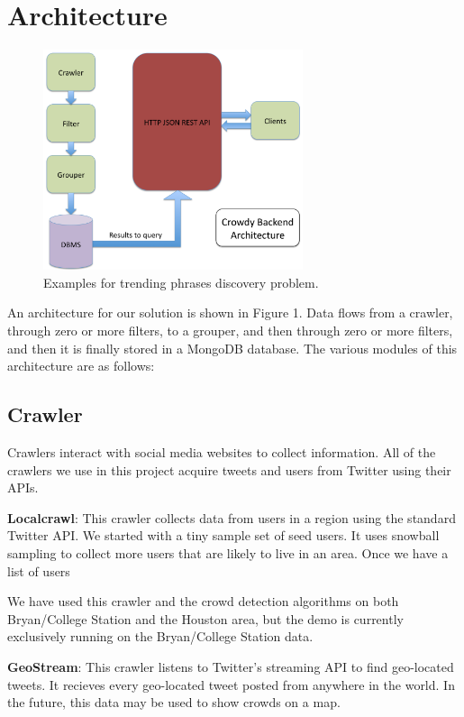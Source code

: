 \documentclass{sig-alternate}
\begin{document}
\section{Architecture}
\label{sec:architecture}
\begin{figure}[!t]
\begin{center}
\includegraphics[width=3.0in]{images/architecture}
\caption{Examples for trending phrases discovery problem.}
\label{fig:candidate_phrases}
\end{center}
\end{figure}

An architecture for our solution is shown in Figure 1.  Data flows from a
crawler, through zero or more filters, to a grouper, and then through zero or
more filters, and then it is finally stored in a MongoDB database.  The various
modules of this architecture are as follows:

\subsection{Crawler}
Crawlers interact with social media websites to collect information. All of the
crawlers we use in this project acquire tweets and users from Twitter using
their APIs.

\medskip \noindent \textbf{Localcrawl}: This crawler collects data from users
in a region using the standard Twitter API. We started with a tiny sample set
of seed users. It uses snowball sampling to collect more users that are likely
to live in an area. Once we have a list of users 

We have used this crawler and the crowd detection algorithms on both Bryan/College
Station and the Houston area, but the demo is currently exclusively running on the
Bryan/College Station data.

\medskip \noindent \textbf{GeoStream}: This crawler listens to Twitter's
streaming API to find geo-located tweets.  It recieves every geo-located tweet
posted from anywhere in the world.  In the future, this data may be used to
show crowds on a map.
\end{document}
